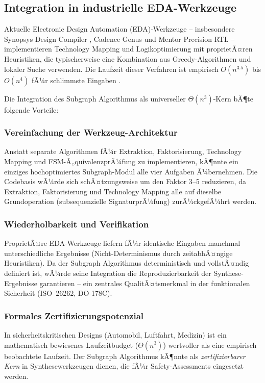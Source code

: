﻿\documentclass[a4paper,12pt]{article}
\theoremstyle{definition}
\begin{document}
\subsection{Integration in industrielle EDA-Werkzeuge}

Aktuelle Electronic Design Automation (EDA)-Werkzeuge -- insbesondere Synopsys Design
Compiler \cite{synopsys_dc}, Cadence Genus und Mentor Precision RTL -- implementieren
Technology Mapping und Logikoptimierung mit proprietÃ¤ren Heuristiken, die typischerweise
eine Kombination aus Greedy-Algorithmen und lokaler Suche verwenden. Die Laufzeit dieser
Verfahren ist empirisch $O(n^{3.5})$ bis $O(n^4)$ fÃ¼r schlimmste Eingaben
\cite{sentovich1992sis}.

Die Integration des Subgraph Algorithmus als universeller $\Theta(n^3)$-Kern bÃ¶te
folgende Vorteile:

\subsubsection{Vereinfachung der Werkzeug-Architektur}

Anstatt separate Algorithmen fÃ¼r Extraktion, Faktorisierung, Technology Mapping und
FSM-Ã„quivalenzprÃ¼fung zu implementieren, kÃ¶nnte ein einziges hochoptimiertes
Subgraph-Modul alle vier Aufgaben Ã¼bernehmen. Die Codebasis wÃ¼rde sich schÃ¤tzungsweise
um den Faktor 3--5 reduzieren, da Extraktion, Faktorisierung und Technology Mapping
alle auf dieselbe Grundoperation (sub\-se\-quen\-zielle SignaturprÃ¼fung) zurÃ¼ckgefÃ¼hrt
werden.

\subsubsection{Wiederholbarkeit und Verifikation}

ProprietÃ¤re EDA-Werkzeuge liefern fÃ¼r identische Eingaben manchmal unterschiedliche
Ergebnisse (Nicht-Determinismus durch zeitabhÃ¤ngige Heuristiken). Da der Subgraph
Algorithmus deterministisch und vollstÃ¤ndig definiert ist, wÃ¼rde seine Integration
die Reproduzierbarkeit der Synthese-Ergebnisse garantieren -- ein zentrales QualitÃ¤tsmerkmal
in der funktionalen Sicherheit (ISO~26262, DO-178C).

\subsubsection{Formales Zertifizierungspotenzial}

In sicherheitskritischen Designs (Automobil, Luftfahrt, Medizin) ist ein mathematisch
bewiesenes Laufzeitbudget ($\Theta(n^3)$) wertvoller als eine empirisch beobachtete
Laufzeit. Der Subgraph Algorithmus kÃ¶nnte als \emph{zertifizierbarer Kern} in
Synthesewerkzeugen dienen, die fÃ¼r Safety-Assessments eingesetzt werden.
\end{document}
